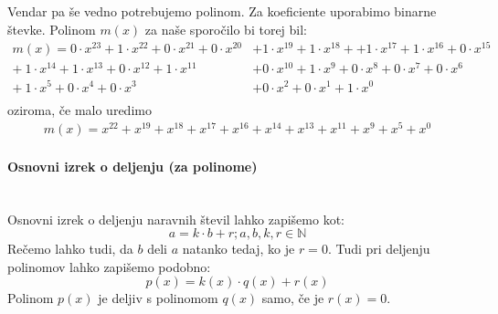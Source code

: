 \documentclass[12pt]{article}
\begin{document}
                Vendar pa še vedno potrebujemo polinom. Za koeficiente uporabimo
                binarne števke. Polinom $m(x)$ za naše sporočilo bi torej bil:
                \begin{equation}
                    \begin{split}
                        m(x) = 0 \cdot x^{23} + 1 \cdot x^{22} + 0 \cdot x^{21}
                        + 0 \cdot x^{20} & + 1 \cdot x^{19} + 1 \cdot x^{18} +
                        + 1 \cdot x^{17} + 1 \cdot x^{16} + 0 \cdot x^{15}\\
                        + \: 1 \cdot x^{14} + 1 \cdot x^{13} + 0 \cdot x^{12}
                        + 1 \cdot x^{11} & + 0  \cdot x^{10} + 1 \cdot x^{9}
                        + 0 \cdot x^{8} + 0 \cdot x^{7} + 0 \cdot x^{6} \\
                        + \:1 \cdot x^{5} + 0 \cdot x^{4} + 0 \cdot x^{3} &
                        + 0 \cdot x^{2} + 0 \cdot x^{1} + 1 \cdot x^{0}\\
                    \end{split}
                \end{equation}
                oziroma, če malo uredimo
                \begin{equation}
                    \begin{split}
                        m(x) = x^{22} + x^{19} + x^{18} + x^{17} + x^{16} +
                        x^{14} + x^{13} + x^{11} + x^{9} + x^{5} + x^{0}
                    \end{split}
                \end{equation}
            \paragraph{Osnovni izrek o deljenju (za polinome)} \mbox{}\\
                Osnovni izrek o deljenju naravnih števil lahko zapišemo kot:
                \begin{equation}
                    a = k \cdot b + r; a,b,k,r \in \mathbb{N}
                \end{equation}
                Rečemo lahko tudi, da $b$ deli $a$ natanko tedaj, ko je $r=0$.
                Tudi pri deljenju polinomov lahko zapišemo podobno:
                \begin{equation}
                    p(x) = k(x) \cdot q(x) + r(x)
                \end{equation}
                Polinom $p(x)$ je deljiv s polinomom $q(x)$ samo, če je $r(x)=0$.
\end{document}
